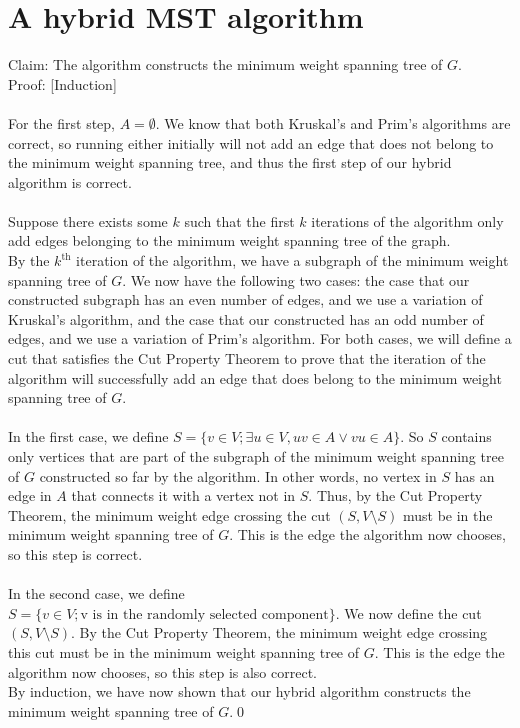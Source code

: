 \documentclass{article}
\begin{document}
\section{A hybrid MST algorithm}
	Claim: The algorithm constructs the minimum weight spanning tree of $G$.\\
	Proof: [Induction]\\\\
	For the first step, $A=\emptyset$. We know that both Kruskal's and Prim's algorithms
	are correct, so running either initially will not add an edge that does not belong to
	the minimum weight spanning tree, and thus the first step of our hybrid algorithm is
	correct.\\\\
	Suppose there exists some $k$ such that the first $k$ iterations of the algorithm only
	add edges belonging to the minimum weight spanning tree of the graph.\\
	By the $k^{\text{th}}$ iteration of the algorithm, we have a subgraph of the minimum
	weight spanning tree of $G$. We now have the following two cases: the case that our
	constructed subgraph has an even number of edges, and we use a variation of Kruskal's
	algorithm, and the case that our constructed has an odd number of edges, and we use a
	variation of Prim's algorithm. For both cases, we will define a cut that satisfies
	the Cut Property Theorem to prove that the iteration of the algorithm will successfully
	add an edge that does belong to the minimum weight spanning tree of $G$.\\\\
	In the first case, we define $S=\{v\in{V};\exists{u\in{V}},{uv}\in{A}\lor{vu}\in{A}\}$. So
	$S$ contains only vertices that are part of the subgraph of the minimum weight spanning
	tree of $G$ constructed so far by the algorithm. In other words, no vertex in $S$ has an
	edge in $A$ that connects it with a vertex not in $S$. Thus, by the Cut Property
	Theorem, the minimum weight edge crossing the cut $(S,V\setminus{S})$ must be in the
	minimum weight spanning tree of $G$. This is the edge the algorithm now chooses, so this
	step is correct.\\\\
	In the second case, we define $S=\{v\in{V};\text{v is in the randomly selected component}\}$.
	We now define the cut $(S,V\setminus{S})$. By the Cut Property Theorem, the minimum weight
	edge crossing this cut must be in the minimum weight spanning tree of $G$. This is the edge
	the algorithm now chooses, so this step is also correct.\\
	By induction, we have now shown that our hybrid algorithm constructs the minimum weight
	spanning tree of $G$.\qed{}
\end{document}
